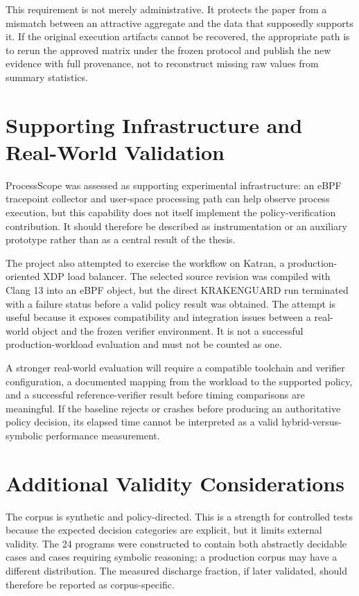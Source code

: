 This requirement is not merely administrative. It protects the paper from a mismatch between an attractive aggregate and the data that supposedly supports it. If the original execution artifacts cannot be recovered, the appropriate path is to rerun the approved matrix under the frozen protocol and publish the new evidence with full provenance, not to reconstruct missing raw values from summary statistics.

\section{Supporting Infrastructure and Real-World Validation}
ProcessScope was assessed as supporting experimental infrastructure: an eBPF tracepoint collector and user-space processing path can help observe process execution, but this capability does not itself implement the policy-verification contribution. It should therefore be described as instrumentation or an auxiliary prototype rather than as a central result of the thesis.

The project also attempted to exercise the workflow on Katran, a production-oriented XDP load balancer. The selected source revision was compiled with Clang 13 into an eBPF object, but the direct KRAKENGUARD run terminated with a failure status before a valid policy result was obtained. The attempt is useful because it exposes compatibility and integration issues between a real-world object and the frozen verifier environment. It is not a successful production-workload evaluation and must not be counted as one.

A stronger real-world evaluation will require a compatible toolchain and verifier configuration, a documented mapping from the workload to the supported policy, and a successful reference-verifier result before timing comparisons are meaningful. If the baseline rejects or crashes before producing an authoritative policy decision, its elapsed time cannot be interpreted as a valid hybrid-versus-symbolic performance measurement.

\section{Additional Validity Considerations}
The corpus is synthetic and policy-directed. This is a strength for controlled tests because the expected decision categories are explicit, but it limits external validity. The 24 programs were constructed to contain both abstractly decidable cases and cases requiring symbolic reasoning; a production corpus may have a different distribution. The measured discharge fraction, if later validated, should therefore be reported as corpus-specific.


